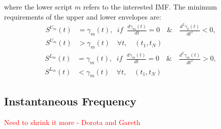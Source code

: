 \begin{Definition}
\begin{itemize}
where the lower script $m$ refers to the interested IMF. The minimum requirements of the upper and lower envelopes are: 
\begin{equation}
\label{cond_1_sp}
\begin{split}
S^{U_m}(t) & =  \gamma_m(t), \; \; if \; \; \frac{d \gamma_m(t)}{dt} = 0 \quad \& \quad \frac{d^2 \gamma_k(t)}{d t^2} <0, \\
S^{U_m} (t) & > \gamma_m(t) \quad  \forall t, \quad (t_1, t_N)
\end{split}
\end{equation}
\begin{equation}
\label{cond_2_sp}
\begin{split}
S^{L_m} (t) & =  \gamma_m(t), \; \; if \; \; \frac{d \gamma_m(t)}{dt} = 0 \quad \& \quad \frac{d^2 \gamma_m(t)}{d t^2} > 0, \\
S^{L_m} (t) & < \gamma_m(t) \quad  \forall t, \quad (t_1, t_N)
\end{split}
\end{equation}
\end{itemize}
\end{Definition}


\subsection{Instantaneous Frequency}
\label{IF}

\textcolor{red}{Need to shrink it more - Dorota and Gareth}

